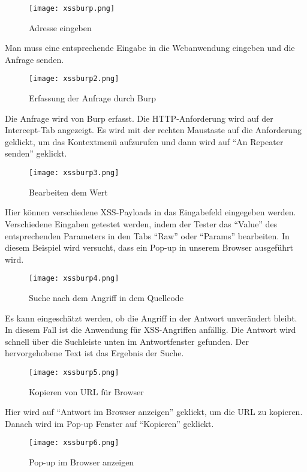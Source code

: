 \begin{figure}[h]
	\centering
	\texttt{[image: xssburp.png]}
	\caption{Adresse eingeben}
\end{figure}

Man muss eine entsprechende Eingabe in die Webanwendung eingeben und die Anfrage senden.

\begin{figure}[h]
	\centering
	\texttt{[image: xssburp2.png]}
	\caption{Erfassung der Anfrage durch Burp}
\end{figure}

Die Anfrage wird von Burp erfasst. Die HTTP-Anforderung wird auf der Intercept-Tab angezeigt. Es wird mit der rechten Maustaste auf die Anforderung geklickt, um das Kontextmenü aufzurufen und dann wird auf "`An Repeater senden"' geklickt.

\begin{figure}[h]
	\centering
	\texttt{[image: xssburp3.png]}
	\caption{Bearbeiten dem Wert}
\end{figure}

Hier können verschiedene XSS-Payloads in das Eingabefeld eingegeben werden. Verschiedene Eingaben getestet werden, indem der Tester das "`Value"' des entsprechenden Parameters in den Tabs "`Raw"' oder "`Params"' bearbeiten. In diesem Beispiel wird versucht, dass ein Pop-up in unserem Browser ausgeführt wird.

\begin{figure}[h]
	\centering
	\texttt{[image: xssburp4.png]}
	\caption{Suche nach dem Angriff in dem Quellcode}
\end{figure}

Es kann eingeschätzt werden, ob die Angriff in der Antwort unverändert bleibt. In diesem Fall ist die Anwendung für XSS-Angriffen anfällig. Die Antwort wird schnell über die Suchleiste unten im Antwortfenster gefunden. Der hervorgehobene Text ist das Ergebnis der Suche.

\begin{figure}[h]
	\centering
	\texttt{[image: xssburp5.png]}
	\caption{Kopieren von URL für Browser}
\end{figure}

Hier wird auf "`Antwort im Browser anzeigen"' geklickt, um die URL zu kopieren. Danach wird im Pop-up Fenster auf "`Kopieren"' geklickt.

\newpage

\begin{figure}[h]
	\centering
	\texttt{[image: xssburp6.png]}
	\caption{Pop-up im Browser anzeigen}
\end{figure}

